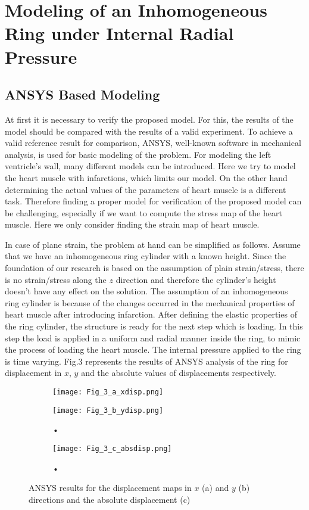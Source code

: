 \documentclass{jicspack}
\begin{document}
\section{Modeling of an Inhomogeneous Ring under Internal Radial Pressure}


\subsection{ANSYS Based Modeling }

At first it is necessary to verify the proposed model. For this, the results of the model should
be compared with the results of a valid experiment. To achieve a valid reference result for
comparison, ANSYS, well-known software in mechanical analysis, is used for basic modeling
of the problem. For modeling the left ventricle’s wall, many different models can be
introduced. Here we try to model the heart muscle with infarctions, which limits our model.
On the other hand determining the actual values of the parameters of heart muscle is a
different task. Therefore finding a proper model for verification of the proposed model can
be challenging, especially if we want to compute the stress map of the heart muscle. Here we only consider finding the strain map of heart muscle. 

In case of plane strain, the problem at hand can be simplified as follows. Assume that we
have an inhomogeneous ring cylinder with a known height. Since the foundation of our
research is based on the assumption of plain strain/stress, there is no strain/stress along the $z$ direction and therefore the cylinder's height doesn't have any effect on the solution. The assumption of an inhomogeneous ring cylinder is because of the changes
occurred in the mechanical properties of heart muscle after introducing infarction.
After defining the elastic properties of the ring cylinder, the structure is ready for the next step which is loading. In this step the load is applied in a uniform and radial manner inside the ring, to mimic the process of loading the heart muscle. The internal pressure applied to the ring is time varying. Fig.3 represents the results of ANSYS analysis of the ring for displacement in $x$, $y$ and the absolute values of displacements respectively. 

\begin{figure}
\centering
\begin{subfigure}[b]{.45\textwidth}
\texttt{[image: Fig\_3\_a\_xdisp.png]}
\caption{}
\end{subfigure}
\begin{subfigure}[b]{0.45\textwidth}
\texttt{[image: Fig\_3\_b\_ydisp.png]}
\caption{•}
\end{subfigure}

\begin{subfigure}[b]{0.45\textwidth}
\texttt{[image: Fig\_3\_c\_absdisp.png]}
\caption{•}
\end{subfigure}
\caption{ANSYS results for the displacement maps in $x$ (a) and $y$ (b) directions and the absolute displacement (c)}
\end{figure}
\end{document}

